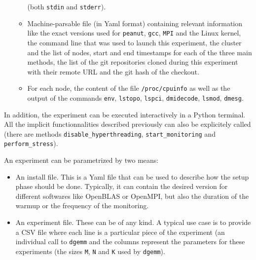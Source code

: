 \begin{itemize}
\begin{itemize}
                            (both \texttt{stdin} and \texttt{stderr}).
                        \item Machine-parsable file (in Yaml format) containing relevant information like
                            the exact versions used for \texttt{peanut}, \texttt{gcc}, \texttt{MPI} and the Linux
                            kernel, the command line that was used to launch this experiment, the cluster and the list
                            of nodes, start and end timestamps for each of the three main methods, the list of the git
                            repositories cloned during this experiment with their remote URL and the git hash of the
                            checkout.
                        \item For each node, the content of the file \texttt{/proc/cpuinfo} as well as the output of the
                            commands \texttt{env}, \texttt{lstopo}, \texttt{lspci}, \texttt{dmidecode},
                            \texttt{lsmod}, \texttt{dmesg}.
                    \end{itemize}
            \end{itemize}
            In addition, the experiment can be executed interactively in a Python terminal. All the implicit
            functionnalities described previously can also be explicitely called (\eg there are methods
            \texttt{disable\_hyperthreading}, \texttt{start\_monitoring} and \texttt{perform\_stress}).

            An experiment can be parametrized by two means:
            \begin{itemize}
                \item An install file. This is a Yaml file that can be used to describe how the setup phase should be
                    done. Typically, it can contain the desired version for different softwares like OpenBLAS or
                    OpenMPI, but also the duration of the warmup or the frequency of the monitoring.
                \item An experiment file. These can be of any kind. A typical use case is to provide a CSV file where
                    each line is a particular piece of the experiment (\eg an individual call to \texttt{dgemm} and the
                    columns represent the parameters for these experiments (\eg the sizes \texttt{M}, \texttt{N} and
                    \texttt{K} used by \texttt{dgemm}).
            \end{itemize}

